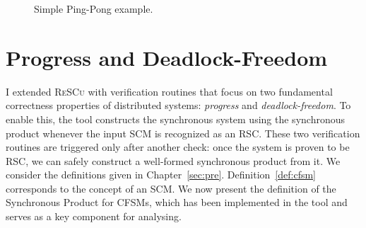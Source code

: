 \begin{example}
\begin{figure}[!ht]
\caption{Simple Ping-Pong example.}
\label{fig:ping}
\end{figure}

\end{example}

\section{Progress and Deadlock-Freedom}
I extended \textsc{ReSCu} with verification routines that focus on two
fundamental correctness properties of distributed systems: \emph{progress} and
\emph{deadlock-freedom}. To enable this, the tool constructs the synchronous
system using the synchronous product whenever the input SCM is recognized as an
RSC. These two verification routines are triggered only after another check: 
once the system is proven to be RSC, we can safely construct a well-formed 
synchronous product from it. We consider the definitions given in Chapter~\ref{sec:pre}.
Definition~\ref{def:cfsm} corresponds to the concept of an SCM. We now present the
definition of the Synchronous Product for CFSMs, which has been implemented in the
tool and serves as a key component for analysing.

\bigskip

